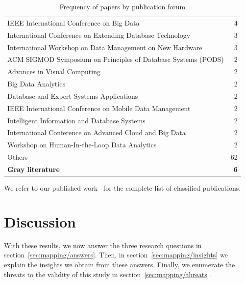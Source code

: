 \begin{table}[hptb]
\begin{tabularx}{\textwidth}{X r}
      \hspace{0.5em} IEEE International Conference on Big Data & 4 \\
      \hspace{0.5em} International Conference on Extending Database Technology & 3 \\
      \hspace{0.5em} International Workshop on Data Management on New Hardware & 3 \\
      \hspace{0.5em} ACM SIGMOD Symposium on Principles of Database Systems (PODS) & 2 \\
      \hspace{0.5em} Advances in Visual Computing & 2 \\
      \hspace{0.5em} Big Data Analytics & 2 \\
      \hspace{0.5em} Database and Expert Systems Applications & 2 \\
      \hspace{0.5em} IEEE International Conference on Mobile Data Management & 2 \\
      \hspace{0.5em} Intelligent Information and Database Systems & 2 \\
      \hspace{0.5em} International Conference on Advanced Cloud and Big Data & 2 \\
      \hspace{0.5em} Workshop on Human-In-the-Loop Data Analytics & 2 \\
      \hspace{0.5em} Others & 62 \\
    \textbf{Gray literature} & \textbf{6}
  \end{tabularx}
  \caption{Frequency of papers by publication forum} \label{tab:mapping/publication}
\end{table}

We refer to our published work~\cite{Alvarez2019} for the complete list of classified publications.

\section{Discussion}
\label{sec:mapping/discussion}

With these results, we now answer the three research questions in
section~\ref{sec:mapping/answers}. Then, in section~\ref{sec:mapping/insights}
we explain the insights we obtain from these answers. Finally,
we enumerate the threats to the validity of this study in
section~\ref{sec:mapping/threats}.


